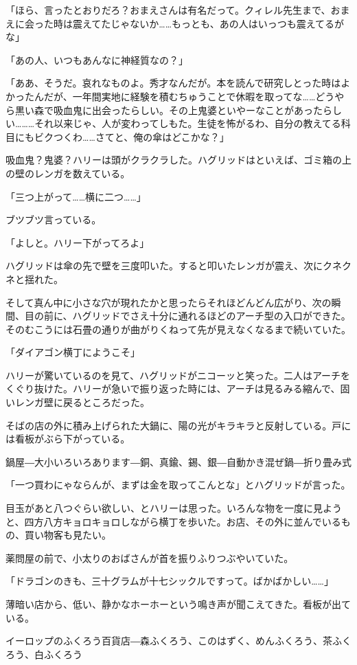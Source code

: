 \documentclass[10pt,a4paper]{article}
\begin{document}
\begin{CJK}{UTF8}{min}
「ほら、言ったとおりだろ？おまえさんは有名だって。クィレル先生まで、おまえに会った時は震えてたじゃないか……もっとも、あの人はいっつも震えてるがな」

「あの人、いつもあんなに神経質なの？」

「ああ、そうだ。哀れなものよ。秀才なんだが。本を読んで研究しとった時はよかったんだが、一年間実地に経験を積むちゅうことで休暇を取ってな……どうやら黒い森で吸血鬼に出会ったらしい。その上鬼婆といやーなことがあったらしい………それ以来じゃ、人が変わってしもた。生徒を怖がるわ、自分の教えてる科目にもビクつくわ……さてと、俺の傘はどこかな？」

吸血鬼？鬼婆？ハリーは頭がクラクラした。ハグリッドはといえば、ゴミ箱の上の壁のレンガを数えている。

「三つ上がって……横に二つ……」

ブツブツ言っている。

「よしと。ハリー下がってろよ」

ハグリッドは傘の先で壁を三度叩いた。すると叩いたレンガが震え、次にクネクネと揺れた。

そして真ん中に小さな穴が現れたかと思ったらそれほどんどん広がり、次の瞬間、目の前に、ハグリッドでさえ十分に通れるほどのアーチ型の入口ができた。そのむこうには石畳の通りが曲がりくねって先が見えなくなるまで続いていた。

「ダイアゴン横丁にようこそ」

ハリーが驚いているのを見て、ハグリッドがニコーッと笑った。二人はアーチをくぐり抜けた。ハリーが急いで振り返った時には、アーチは見るみる縮んで、固いレンガ壁に戻るところだった。

そばの店の外に積み上げられた大鍋に、陽の光がキラキラと反射している。戸には看板がぶら下がっている。

鍋屋―大小いろいろあります―銅、真鍮、錫、銀―自動かき混ぜ鍋―折り畳み式

「一つ買わにゃならんが、まずは金を取ってこんとな」とハグリッドが言った。

目玉があと八つぐらい欲しい、とハリーは思った。いろんな物を一度に見ようと、四方八方キョロキョロしながら横丁を歩いた。お店、その外に並んでいるもの、買い物客も見たい。

薬問屋の前で、小太りのおばさんが首を振りふりつぶやいていた。

「ドラゴンのきも、三十グラムが十七シックルですって。ばかばかしい……」

薄暗い店から、低い、静かなホーホーという鳴き声が聞こえてきた。看板が出ている。

イーロップのふくろう百貨店―森ふくろう、このはずく、めんふくろう、茶ふくろう、白ふくろう


\end{CJK}
\end{document}
